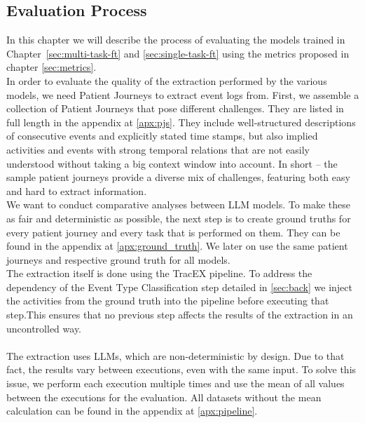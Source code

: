 \subsection{Evaluation Process}\label{sec:eval_process}
In this chapter we will describe the process of evaluating the models trained in Chapter~\ref{sec:multi-task-ft} and \ref{sec:single-task-ft} using the metrics proposed in chapter \ref{sec:metrics}.\\
In order to evaluate the quality of the extraction performed by the various models, we need Patient Journeys to extract event logs from. First, we assemble a collection of Patient Journeys that pose different challenges. They are listed in full length in the appendix at \ref{apx:pjs}. They include well-structured descriptions of consecutive events and explicitly stated time stamps, but also implied activities and events with strong temporal relations that are not easily understood without taking a big context window into account. In short – the sample patient journeys provide a diverse mix of challenges, featuring both easy and hard to extract information.\\
We want to conduct comparative analyses between LLM models. To make these as fair and deterministic as possible, the next step is to create ground truths for every patient journey and every task that is performed on them. They can be found in the appendix at \ref{apx:ground_truth}. We later on use the same patient journeys and respective ground truth for all models.\\
The extraction itself is done using the TracEX pipeline. To address the dependency of the Event Type Classification step detailed in \ref{sec:back} we inject the activities from the ground truth into the pipeline before executing that step.This ensures that no previous step affects the results of the extraction in an uncontrolled way.\\\\
The extraction uses LLMs, which are non-deterministic by design. Due to that fact, the results vary between executions, even with the same input. To solve this issue, we perform each execution multiple times and use the mean of all values between the executions for the evaluation. All datasets without the mean calculation can be found in the appendix at \ref{apx:pipeline}.

